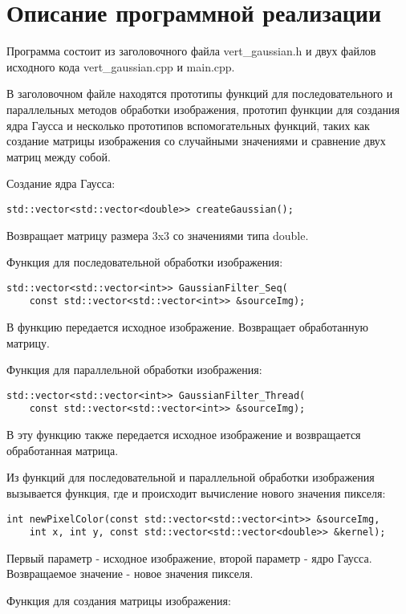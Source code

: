 \documentclass{report}
\begin{document}
\section*{Описание программной реализации}
Программа состоит из заголовочного файла vert\_gaussian.h и двух файлов исходного кода vert\_gaussian.cpp и main.cpp.
\par В заголовочном файле находятся прототипы функций для последовательного и параллельных методов обработки изображения, прототип функции для создания ядра Гаусса и несколько прототипов вспомогательных функций, таких как создание матрицы изображения со случайными значениями и сравнение двух матриц между собой.
\par Создание ядра Гаусса:
\begin{lstlisting}
std::vector<std::vector<double>> createGaussian();
\end{lstlisting}
\par Возвращает матрицу размера 3x3 со значениями типа double.
\par Функция для последовательной обработки изображения:
\begin{lstlisting}
std::vector<std::vector<int>> GaussianFilter_Seq(
    const std::vector<std::vector<int>> &sourceImg);
\end{lstlisting}
\par В функцию передается исходное изображение. Возвращает обработанную матрицу.
\par Функция для параллельной обработки изображения:
\begin{lstlisting}
std::vector<std::vector<int>> GaussianFilter_Thread(
    const std::vector<std::vector<int>> &sourceImg);
\end{lstlisting}
\par В эту функцию также передается исходное изображение и возвращается обработанная матрица.
\par Из функций для последовательной и параллельной обработки изображения вызывается функция, где и происходит вычисление нового значения пикселя:
\begin{lstlisting}
int newPixelColor(const std::vector<std::vector<int>> &sourceImg,
    int x, int y, const std::vector<std::vector<double>> &kernel);
\end{lstlisting}
\par Первый параметр - исходное изображение, второй параметр - ядро Гаусса. Возвращаемое значение - новое значения пикселя.
\par Функция для создания матрицы изображения:
\end{document}
